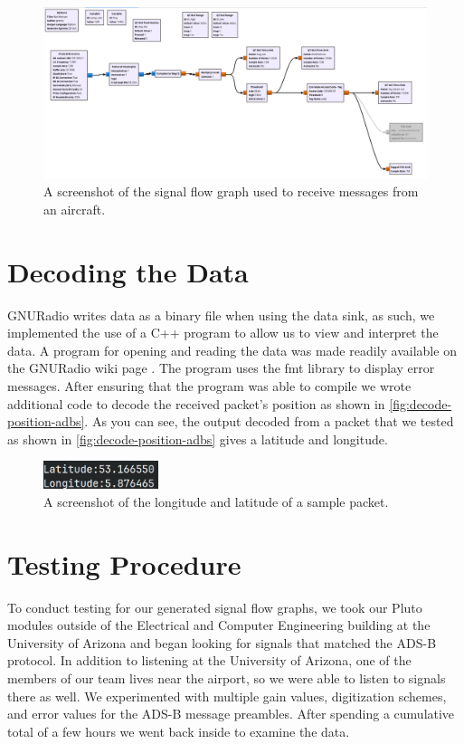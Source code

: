 \documentclass[conference, onecolumn]{IEEEtran}
\begin{document}
\begin{figure}
  \begin{center}
    \includegraphics[width=\textwidth]{./figures/fig_sfg_gnuradio.png}
  \end{center}
  \caption{A screenshot of the signal flow graph used to receive messages from an aircraft.}\label{fig:fig_sfg_gnuradio}
\end{figure}


\section{Decoding the Data}
GNURadio writes data as a binary file when using the data sink, as such, we implemented the use of a C++ program to allow us to view and interpret the data. A program for opening and reading the data was made readily available on the GNURadio wiki page \cite{gnuradio-reading-file-cpp}. The program uses the fmt library\cite{fmt-library} to display error messages. After ensuring that the program was able to compile we wrote additional code to decode the received packet's position as shown in \autoref{fig:decode-position-adbs}. As you can see, the output decoded from a packet that we tested as shown in \autoref{fig:decode-position-adbs} gives a latitude and longitude.


\begin{figure}
  \begin{center}
    \includegraphics[width=0.3\textwidth]{./figures/fig_output_decode.png}
  \end{center}
  \caption{A screenshot of the longitude and latitude of a sample packet.}\label{fig:decode-position-adbs}
\end{figure}


\section{Testing Procedure}
To conduct testing for our generated signal flow graphs, we took our Pluto modules outside of the Electrical and Computer Engineering building at the University of Arizona and began looking for signals that matched the ADS-B protocol. In addition to listening at the University of Arizona, one of the members of our team lives near the airport, so we were able to listen to signals there as well. We experimented with multiple gain values, digitization schemes, and error values for the ADS-B message preambles. After spending a cumulative total of a few hours we went back inside to examine the data.
\end{document}
